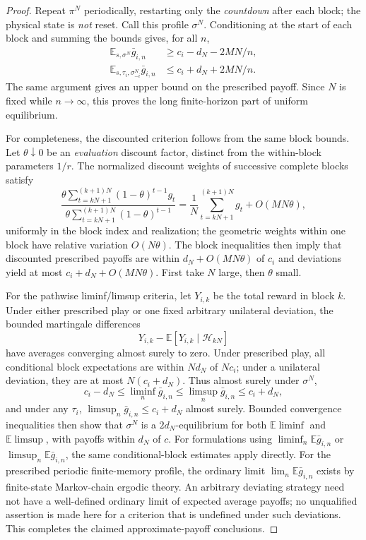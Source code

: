 \documentclass[11pt,a4paper]{article}
\numberwithin{equation}{section}
\theoremstyle{definition}
\theoremstyle{remark}
\newcommand{\E}{\mathbb E}
\newcommand{\calH}{\mathcal H}
\newcommand{\sig}{\sigma}
\begin{document}
\begin{proof}
Repeat $\pi^N$ periodically, restarting only the \emph{countdown} after each
block; the physical state is \emph{not} reset. Call this profile $\sig^N$.
Conditioning at the start of each block and summing the bounds gives, for
all $n$,
\begin{align}
 \E_{s,\sig^N}\bar g_{i,n}&\ge c_i-d_N-2MN/n,\label{eq:uniformlower}\\
 \E_{s,\tau_i,\sig^N_{-i}}\bar g_{i,n}
 &\le c_i+d_N+2MN/n.\label{eq:uniformupper}
\end{align}
The same argument gives an upper bound on the prescribed payoff. Since
$N$ is fixed while $n\to\infty$, this proves the long finite-horizon part
of uniform equilibrium.

For completeness, the discounted criterion follows from the same block
bounds. Let $\theta\downarrow0$ be an \emph{evaluation} discount factor,
distinct from the within-block parameters $1/r$. The normalized discount
weights of successive complete blocks satisfy
\[
 \frac{\theta\sum_{t=kN+1}^{(k+1)N}(1-\theta)^{t-1}g_t}
 {\theta\sum_{t=kN+1}^{(k+1)N}(1-\theta)^{t-1}}
 =\frac1N\sum_{t=kN+1}^{(k+1)N}g_t+O(MN\theta),
\]
uniformly in the block index and realization; the geometric weights within
one block have relative variation $O(N\theta)$. The block inequalities
then imply that discounted prescribed payoffs are within
$d_N+O(MN\theta)$ of $c_i$ and deviations yield at most
$c_i+d_N+O(MN\theta)$. First take $N$ large, then $\theta$ small.

For the pathwise liminf/limsup criteria, let $Y_{i,k}$ be the total reward
in block $k$. Under either prescribed play or one fixed arbitrary unilateral
deviation, the bounded martingale differences
\[
 Y_{i,k}-\E[Y_{i,k}\mid\calH_{kN}]
\]
have averages converging almost surely to zero. Under prescribed play,
all conditional block expectations are within $Nd_N$ of $Nc_i$;
under a unilateral deviation, they are at most $N(c_i+d_N)$.
Thus almost surely under $\sig^N$,
\[
 c_i-d_N\le\liminf_n\bar g_{i,n}
 \le\limsup_n\bar g_{i,n}\le c_i+d_N,
\]
and under any $\tau_i$,
$\limsup_n\bar g_{i,n}\le c_i+d_N$ almost surely.
Bounded convergence inequalities then show that $\sig^N$ is a
$2d_N$-equilibrium for both $\E\liminf$ and $\E\limsup$, with payoffs
within $d_N$ of $c$. For formulations using $\liminf_n\E\bar g_{i,n}$ or
$\limsup_n\E\bar g_{i,n}$, the same conditional-block estimates
apply directly. For the prescribed periodic finite-memory profile,
the ordinary limit $\lim_n\E\bar g_{i,n}$ exists by finite-state
Markov-chain ergodic theory. An arbitrary deviating strategy need not
have a well-defined ordinary limit of expected average payoffs; no
unqualified assertion is made here for a criterion that is undefined
under such deviations. This completes the claimed approximate-payoff
conclusions.
\end{proof}
\end{document}
